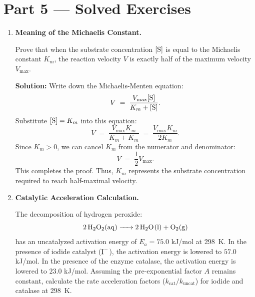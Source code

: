 \documentclass[12pt, a4paper]{book}
\begin{document}
\newpage

\section{Part 5 --- Solved Exercises}

\begin{problembox}
\begin{enumerate}[label=\textbf{E\arabic*.}]
  \item \textbf{Meaning of the Michaelis Constant.}
  
        Prove that when the substrate concentration $[\ce{S}]$ is equal to the Michaelis constant $K_m$, the reaction velocity $V$ is exactly half of the maximum velocity $V_{\text{max}}$.
        
        \textbf{Solution:}
        Write down the Michaelis-Menten equation:
        \[
          V \;=\; \frac{V_{\text{max}} [\ce{S}]}{K_m + [\ce{S}]}.
        \]
        Substitute $[\ce{S}] = K_m$ into this equation:
        \[
          V \;=\; \frac{V_{\text{max}} K_m}{K_m + K_m} \;=\; \frac{V_{\text{max}} K_m}{2 K_m}.
        \]
        Since $K_m > 0$, we can cancel $K_m$ from the numerator and denominator:
        \[
          V \;=\; \frac{1}{2} V_{\text{max}}.
        \]
        This completes the proof. Thus, $K_m$ represents the substrate concentration required to reach half-maximal velocity.
        
  \item \textbf{Catalytic Acceleration Calculation.}
  
        The decomposition of hydrogen peroxide:
        \[
          \ce{2 H2O2(aq) -> 2 H2O(l) + O2(g)}
        \]
        has an uncatalyzed activation energy of $E_a = 75.0$ kJ/mol at \SI{298}{K}.
        In the presence of iodide catalyst ($\ce{I-}$), the activation energy is lowered to $57.0$ kJ/mol.
        In the presence of the enzyme catalase, the activation energy is lowered to $23.0$ kJ/mol.
        Assuming the pre-exponential factor $A$ remains constant, calculate the rate acceleration factors ($k_{\text{cat}}/k_{\text{uncat}}$) for iodide and catalase at \SI{298}{K}.
        

\end{enumerate}
\end{problembox}
\end{document}
